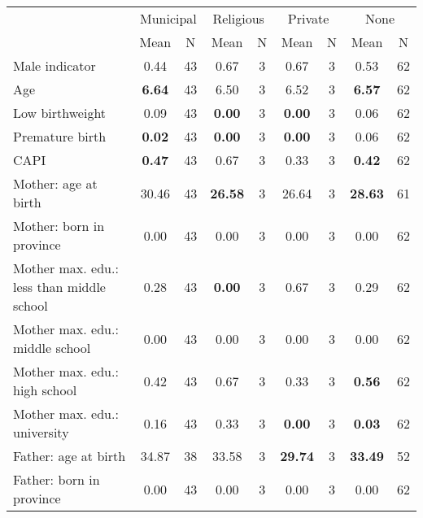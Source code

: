 \begin{tabular}{l c c c c c c c c}
\toprule
& \multicolumn{2}{c}{Municipal} & \multicolumn{2}{c}{Religious} & \multicolumn{2}{c}{Private} & \multicolumn{2}{c}{None} \\
& \scriptsize Mean & \scriptsize N & \scriptsize Mean & \scriptsize N & \scriptsize Mean & \scriptsize N & \scriptsize Mean & \scriptsize N \\
\midrule
Male indicator &      0.44 &        43 &      0.67 &         3 &      0.67 &         3 &      0.53 &        62 \\
Age & \textbf{     6.64} &        43 &      6.50 &         3 &      6.52 &         3 & \textbf{     6.57} &        62 \\
Low birthweight &      0.09 &        43 & \textbf{     0.00} &         3 & \textbf{     0.00} &         3 &      0.06 &        62 \\
Premature birth & \textbf{     0.02} &        43 & \textbf{     0.00} &         3 & \textbf{     0.00} &         3 &      0.06 &        62 \\
CAPI & \textbf{     0.47} &        43 &      0.67 &         3 &      0.33 &         3 & \textbf{     0.42} &        62 \\
Mother: age at birth &     30.46 &        43 & \textbf{    26.58} &         3 &     26.64 &         3 & \textbf{    28.63} &        61 \\
Mother: born in province &      0.00 &        43 &      0.00 &         3 &      0.00 &         3 &      0.00 &        62 \\
Mother max. edu.: less than middle school &      0.28 &        43 & \textbf{     0.00} &         3 &      0.67 &         3 &      0.29 &        62 \\
Mother max. edu.: middle school &      0.00 &        43 &      0.00 &         3 &      0.00 &         3 &      0.00 &        62 \\
Mother max. edu.: high school &      0.42 &        43 &      0.67 &         3 &      0.33 &         3 & \textbf{     0.56} &        62 \\
Mother max. edu.: university &      0.16 &        43 &      0.33 &         3 & \textbf{     0.00} &         3 & \textbf{     0.03} &        62 \\
Father: age at birth &     34.87 &        38 &     33.58 &         3 & \textbf{    29.74} &         3 & \textbf{    33.49} &        52 \\
Father: born in province &      0.00 &        43 &      0.00 &         3 &      0.00 &         3 &      0.00 &        62 \\

\end{tabular}
